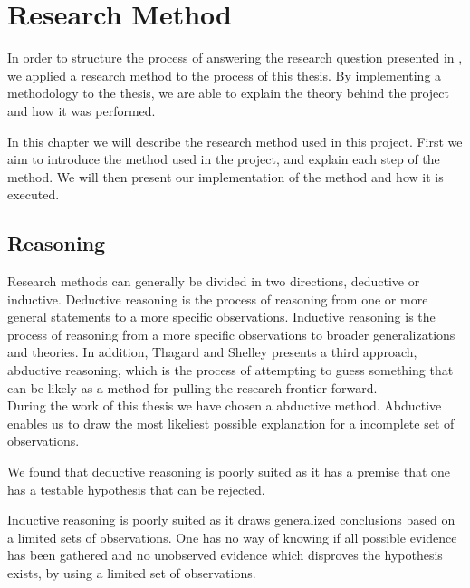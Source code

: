 
\chapter{Research Method} %
\label{cha:research_questions_and_method}
In order to structure the process of answering the research question presented
in , we applied a research method to the 
process of this thesis. By implementing a methodology to the thesis, we are
able to explain the theory behind the project and how it was performed.

In this chapter we will describe the research method used in this project.
First we aim to introduce the method used in the project, and explain each step
of the method. We will then present our implementation of the method and how it
is executed.

\section{Reasoning} %
\label{sec:reasoning}
Research methods can generally be divided in two directions, deductive or
inductive. Deductive reasoning is the process of reasoning from one or more
general statements to a more specific observations. Inductive reasoning is the
process of reasoning from a more specific observations to broader
generalizations and theories. \cite{ deductionAndInductionTrochim}
In addition, Thagard and Shelley \cite{thagard1997abductive} presents a
third approach, abductive \cite{ wiki:abductiveReasoning} reasoning, 
which is the process of attempting to guess something that can be likely as a method for pulling the research frontier forward.\\

During the work of this thesis we have chosen a abductive method. Abductive
enables us to draw the most likeliest possible explanation for a incomplete set
of observations.

We found that deductive reasoning is poorly suited as it has a premise that 
one has a testable hypothesis that can be rejected. %

Inductive reasoning is poorly suited as it draws generalized conclusions based
on a limited sets of observations. One has no way of knowing if all possible
evidence has been gathered and no unobserved evidence which disproves the
hypothesis exists, by using a limited set of observations\cite{ deductionAndInductionButte}.

